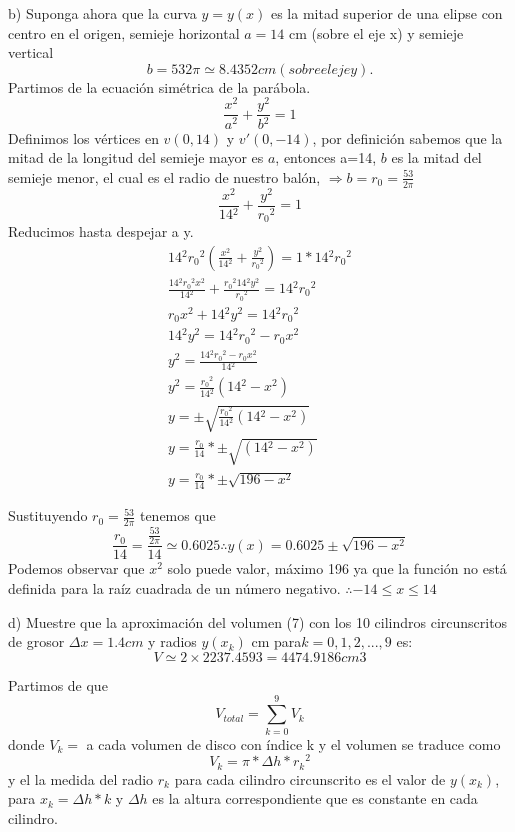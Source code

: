 \documentclass{article}
\begin{document}
    b) Suponga ahora que la curva $y = y (x)$ es la mitad superior de una elipse con
    centro en el origen, semieje horizontal $a = 14$ cm (sobre el eje x) y semieje vertical
    $$b = 53 2\pi \simeq 8.4352 cm (sobre el eje y).$$
    Partimos de la ecuación simétrica de la parábola.
    $$\frac{x{^2}}{a{^2}}+\frac{y{^2}}{b{^2}}=1$$Definimos los vértices en $v(0,14)$ y $v'(0,-14)$, por definición sabemos que la mitad de la longitud del semieje mayor es $a$, entonces a=14, $b$ es la mitad del semieje menor, el cual es el radio de nuestro balón, $\Rightarrow b=r_{0}=\frac{53}{2\pi}$
    $$\frac{x{^2}}{14{^2}}+\frac{y{^2}}{r_{0}{^2}}=1$$
    Reducimos hasta despejar a y.
    \begin{gather*}
    14{^2}r_{0}{^2}\left( \frac{x{^2}}{14{^2}} +\frac{y{^2}}{r_{0}{^2}}\right)= 1*14{^2}r_{0}{^2}\\
    \frac{14{^2}r_{0}{^2}x{^2}}{14{^2}} +\frac{r_{0}{^2}14{^2}y{^2}}{r_{0}{^2}}=14{^2}r_{0}{^2}\\
    r_{0}x{^2}+14{^2}y{^2}=14{^2}r_{0}{^2}\\
    14{^2}y{^2}=14{^2}r_{0}{^2}-r_{0}x{^2}\\
    y{^2}=\frac{14{^2}r_{0}{^2}-r_{0}x{^2}}{14{^2}}\\
    y{^2}=\frac{r_{0}{^2}}{14{^2}}(14{^2}-x{^2})\\
    y=\pm\sqrt{ \frac{r_{0}{^2}}{14{^2}}(14{^2}-x{^2}) }\\
    y=\frac{r_{0}}{14}*\pm\sqrt{(14{^2}-x{^2})}\\
    y=\frac{r_{0}}{14}*\pm\sqrt{196-x{^2}}
    \end{gather*}
    
    Sustituyendo $r_0=\frac{53}{2\pi}$ tenemos que $$\frac{r_{0}}{14}=\frac{\frac{53}{2\pi}}{14}\simeq 0.6025\therefore y(x)=0.6025\pm \sqrt{ 196-x{^2} }$$
    Podemos observar que $x{^2}$ solo puede valor, máximo 196 ya que la función no está definida para la raíz cuadrada de un número negativo. $\therefore -14\leq x\leq 14$ 
    
    d) Muestre que la aproximación del volumen (7) con los 10 cilindros circunscritos de
    grosor $\Delta x = 1.4 cm$ y radios $y (x_{k})$ cm para$k = 0, 1, 2, . . . , 9$ es:
    $$V \simeq 2 \times 2237.4593 = 4474.9186 cm3$$
    
    Partimos de que 
    $$V_{total}=\sum_{k=0}^{9}V_{k}$$
    donde $V_{k}=$ a cada volumen de disco con índice k y el volumen se traduce como$$V_{k}=\pi*\Delta h*r_{k}{^2}$$
    y el la medida del radio $r_{k}$ para cada cilindro circunscrito es el valor de $y(x_k)$, para $x_{k}=\Delta h*k$
    y $\Delta h$ es la altura correspondiente que es constante en cada cilindro.
    
\end{document}
